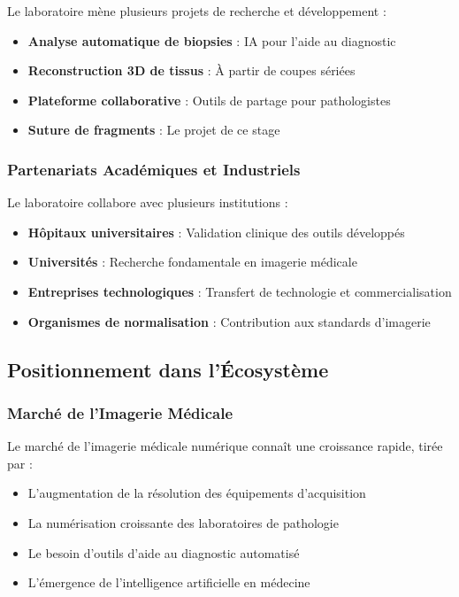 \documentclass[12pt,a4paper]{article}
\begin{document}
Le laboratoire mène plusieurs projets de recherche et développement :

\begin{itemize}
\item \textbf{Analyse automatique de biopsies} : IA pour l'aide au diagnostic
\item \textbf{Reconstruction 3D de tissus} : À partir de coupes sériées
\item \textbf{Plateforme collaborative} : Outils de partage pour pathologistes
\item \textbf{Suture de fragments} : Le projet de ce stage
\end{itemize}

\subsubsection{Partenariats Académiques et Industriels}

Le laboratoire collabore avec plusieurs institutions :

\begin{itemize}
\item \textbf{Hôpitaux universitaires} : Validation clinique des outils développés
\item \textbf{Universités} : Recherche fondamentale en imagerie médicale
\item \textbf{Entreprises technologiques} : Transfert de technologie et commercialisation
\item \textbf{Organismes de normalisation} : Contribution aux standards d'imagerie
\end{itemize}

\subsection{Positionnement dans l'Écosystème}

\subsubsection{Marché de l'Imagerie Médicale}

Le marché de l'imagerie médicale numérique connaît une croissance rapide, tirée par :

\begin{itemize}
\item L'augmentation de la résolution des équipements d'acquisition
\item La numérisation croissante des laboratoires de pathologie
\item Le besoin d'outils d'aide au diagnostic automatisé
\item L'émergence de l'intelligence artificielle en médecine
\end{itemize}
\end{document}
